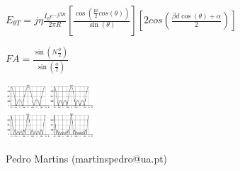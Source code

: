 \documentclass[10pt,landscape]{article}
\begin{document}
\begin{multicols}{4}
$E_{\theta T} = j\eta \frac{I_0e^{-j\beta R}}{2\pi R} \left[\frac{\cos\left(\frac{pi}{2}cos(\theta)\right)}{\sin(\theta)}\right]\left[2cos\left(\frac{\beta d \cos(\theta) + \alpha}{2}\right)\right]$

$FA = \frac{\sin(N\frac{\phi}{2})}{\sin(\frac{\phi}{2})}$


\includegraphics[width=0.25\textwidth]{images/radiation_diagram.png}


\vfill
{\scriptsize \raggedleft  Pedro Martins (martinspedro@ua.pt)}

\end{multicols}
\end{document}
